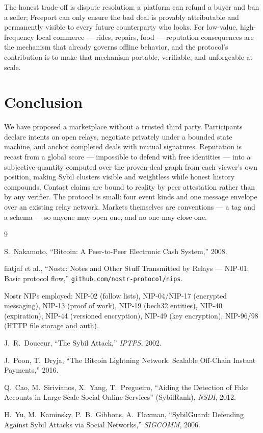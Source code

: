 \documentclass[11pt]{article}
\begin{document}
The honest trade-off is dispute resolution: a platform can refund a buyer
and ban a seller; Freeport can only ensure the bad deal is provably
attributable and permanently visible to every future counterparty who looks.
For low-value, high-frequency local commerce --- rides, repairs, food ---
reputation consequences are the mechanism that already governs offline
behavior, and the protocol's contribution is to make that mechanism
portable, verifiable, and unforgeable at scale.

\section{Conclusion}

We have proposed a marketplace without a trusted third party. Participants
declare intents on open relays, negotiate privately under a bounded state
machine, and anchor completed deals with mutual signatures. Reputation is
recast from a global score --- impossible to defend with free identities ---
into a subjective quantity computed over the proven-deal graph from each
viewer's own position, making Sybil clusters visible and weightless while
honest history compounds. Contact claims are bound to reality by peer
attestation rather than by any verifier. The protocol is small: four event
kinds and one message envelope over an existing relay network. Markets
themselves are conventions --- a tag and a schema --- so anyone may open
one, and no one may close one.

\begin{thebibliography}{9}
\small

 S.~Nakamoto, ``Bitcoin: A Peer-to-Peer Electronic Cash
System,'' 2008.

 fiatjaf et al., ``Nostr: Notes and Other Stuff Transmitted
by Relays --- NIP-01: Basic protocol flow,''
\texttt{github.com/nostr-protocol/nips}.

 Nostr NIPs employed: NIP-02 (follow lists), NIP-04/NIP-17
(encrypted messaging), NIP-13 (proof of work), NIP-19 (bech32 entities),
NIP-40 (expiration), NIP-44 (versioned encryption), NIP-49 (key encryption),
NIP-96/98 (HTTP file storage and auth).

 J.~R.~Douceur, ``The Sybil Attack,'' \emph{IPTPS}, 2002.

 J.~Poon, T.~Dryja, ``The Bitcoin Lightning Network:
Scalable Off-Chain Instant Payments,'' 2016.

 Q.~Cao, M.~Sirivianos, X.~Yang, T.~Pregueiro, ``Aiding
the Detection of Fake Accounts in Large Scale Social Online Services''
(SybilRank), \emph{NSDI}, 2012.

 H.~Yu, M.~Kaminsky, P.~B.~Gibbons, A.~Flaxman,
``SybilGuard: Defending Against Sybil Attacks via Social Networks,''
\emph{SIGCOMM}, 2006.

\end{thebibliography}
\end{document}
